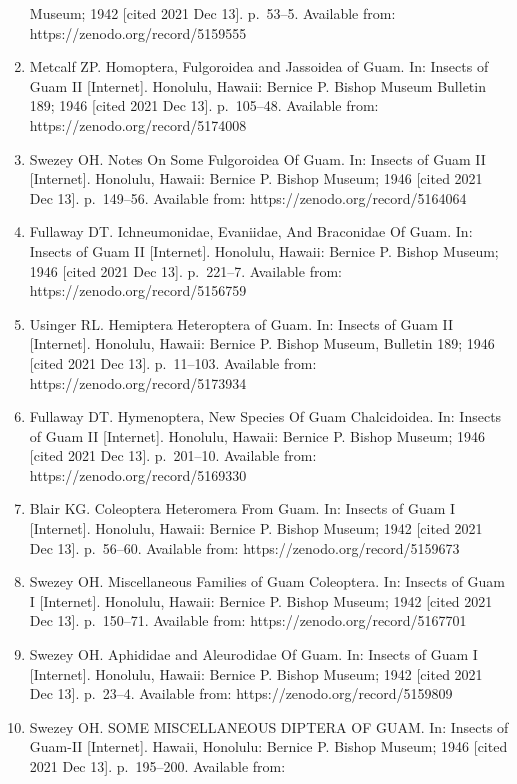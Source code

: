 \documentclass[
]{article}
\begin{document}
\begin{enumerate}
  Museum; 1942 {[}cited 2021 Dec 13{]}. p.~53--5. Available from:
  https://zenodo.org/record/5159555
\item
  Metcalf ZP. Homoptera, Fulgoroidea and Jassoidea of Guam. In: Insects
  of Guam II {[}Internet{]}. Honolulu, Hawaii: Bernice P. Bishop Museum
  Bulletin 189; 1946 {[}cited 2021 Dec 13{]}. p.~105--48. Available
  from: https://zenodo.org/record/5174008
\item
  Swezey OH. Notes On Some Fulgoroidea Of Guam. In: Insects of Guam II
  {[}Internet{]}. Honolulu, Hawaii: Bernice P. Bishop Museum; 1946
  {[}cited 2021 Dec 13{]}. p.~149--56. Available from:
  https://zenodo.org/record/5164064
\item
  Fullaway DT. Ichneumonidae, Evaniidae, And Braconidae Of Guam. In:
  Insects of Guam II {[}Internet{]}. Honolulu, Hawaii: Bernice P. Bishop
  Museum; 1946 {[}cited 2021 Dec 13{]}. p.~221--7. Available from:
  https://zenodo.org/record/5156759
\item
  Usinger RL. Hemiptera Heteroptera of Guam. In: Insects of Guam II
  {[}Internet{]}. Honolulu, Hawaii: Bernice P. Bishop Museum, Bulletin
  189; 1946 {[}cited 2021 Dec 13{]}. p.~11--103. Available from:
  https://zenodo.org/record/5173934
\item
  Fullaway DT. Hymenoptera, New Species Of Guam Chalcidoidea. In:
  Insects of Guam II {[}Internet{]}. Honolulu, Hawaii: Bernice P. Bishop
  Museum; 1946 {[}cited 2021 Dec 13{]}. p.~201--10. Available from:
  https://zenodo.org/record/5169330
\item
  Blair KG. Coleoptera Heteromera From Guam. In: Insects of Guam I
  {[}Internet{]}. Honolulu, Hawaii: Bernice P. Bishop Museum; 1942
  {[}cited 2021 Dec 13{]}. p.~56--60. Available from:
  https://zenodo.org/record/5159673
\item
  Swezey OH. Miscellaneous Families of Guam Coleoptera. In: Insects of
  Guam I {[}Internet{]}. Honolulu, Hawaii: Bernice P. Bishop Museum;
  1942 {[}cited 2021 Dec 13{]}. p.~150--71. Available from:
  https://zenodo.org/record/5167701
\item
  Swezey OH. Aphididae and Aleurodidae Of Guam. In: Insects of Guam I
  {[}Internet{]}. Honolulu, Hawaii: Bernice P. Bishop Museum; 1942
  {[}cited 2021 Dec 13{]}. p.~23--4. Available from:
  https://zenodo.org/record/5159809
\item
  Swezey OH. SOME MISCELLANEOUS DIPTERA OF GUAM. In: Insects of Guam-II
  {[}Internet{]}. Hawaii, Honolulu: Bernice P. Bishop Museum; 1946
  {[}cited 2021 Dec 13{]}. p.~195--200. Available from:

\end{enumerate}
\end{document}
